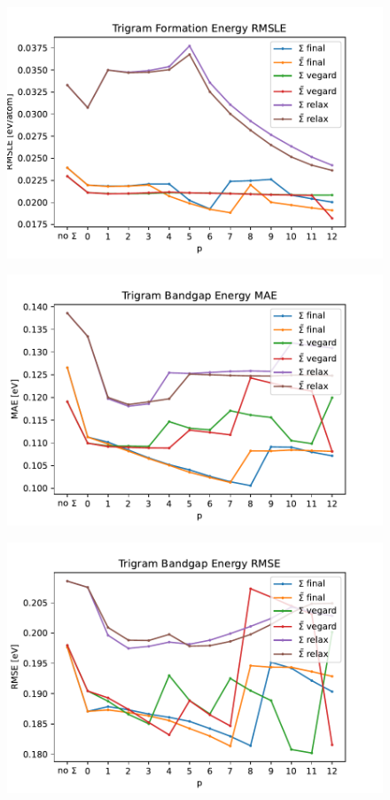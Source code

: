 \documentclass[11pt,oneside,czech,american]{book} %
\theoremstyle{definition} %
\theoremstyle{definition}
\begin{document}
\begin{figure}[H]
	\centering
	\includegraphics[scale=0.6]{trigram_RMSLE_form.pdf}
	\caption{}
	\label{}
\end{figure}
\begin{figure}[H]
	\centering
	\includegraphics[scale=0.6]{trigram_MAE_gap.pdf}
	\caption{}
	\label{}
\end{figure}
\begin{figure}[H]
	\centering
	\includegraphics[scale=0.6]{trigram_RMSE_gap.pdf}
	\caption{}
	\label{}
\end{figure}
\end{document}
